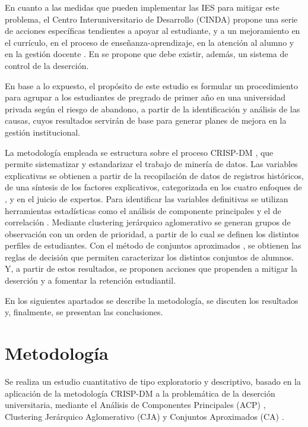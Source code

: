 \documentclass[portuguese]{textolivre}
\begin{document}
En cuanto a las medidas que pueden implementar las IES para mitigar este problema, el Centro Interuniversitario de Desarrollo (CINDA) propone una serie de acciones específicas tendientes a apoyar al estudiante, y a un mejoramiento en el currículo, en el proceso de enseñanza-aprendizaje, en la atención al alumno y en la gestión docente \cite{CentroInteruniversitariodeDesarrolloCINDA2006}. En \cite{HuescaRamirez2007} se propone que debe existir, además, un sistema de control de la deserción.

En base a lo expuesto, el propósito de este estudio es formular un procedimiento para agrupar a los estudiantes de pregrado de primer año en una universidad privada según el riesgo de abandono, a partir de la identificación y análisis de las causas, cuyos resultados servirán de base para generar planes de mejora en la gestión institucional.

La metodología empleada se estructura sobre el proceso CRISP-DM \cite{Chapman1999}, que permite sistematizar y estandarizar el trabajo de minería de datos. Las variables explicativas se obtienen a partir de la recopilación de datos de registros históricos, de una síntesis de los factores explicativos, categorizada en los cuatro enfoques de \cite{Cabrera2006}, y en el juicio de expertos. Para identificar las variables definitivas se utilizan herramientas estadísticas como el análisis de componente principales \cite{Fenyes2021} y el de correlación \cite{Hernandez2018}. Mediante clustering jerárquico aglomerativo \cite{Behr2021} se generan grupos de observación con un orden de prioridad, a partir de lo cual se definen los distintos perfiles de estudiantes. Con el método de conjuntos aproximados \cite{Bouzayane2017}, se obtienen las reglas de decisión que permiten caracterizar los distintos conjuntos de alumnos. Y, a partir de estos resultados, se proponen acciones que propenden a mitigar la deserción y a fomentar la retención estudiantil.

En los siguientes apartados se describe la metodología, se discuten los resultados y, finalmente, se presentan las conclusiones.

\section{Metodología}\label{sec-normas}

Se realiza un estudio cuantitativo de tipo exploratorio y descriptivo, basado en la aplicación de la metodología CRISP-DM \cite{Chapman1999} a la problemática de la deserción universitaria, mediante el Análisis de Componentes Principales (ACP) \cite{Fenyes2021}, Clustering Jerárquico Aglomerativo (CJA) \cite{Behr2021} y Conjuntos Aproximados (CA) \cite{Bouzayane2017}.
\end{document}
